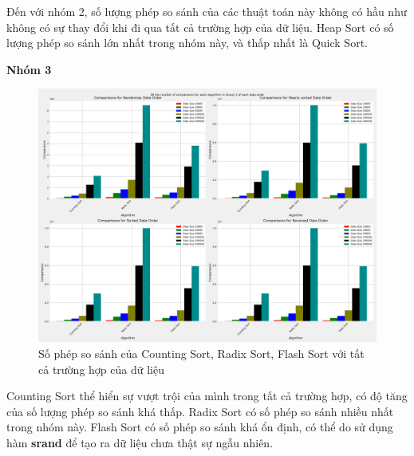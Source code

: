 Đến với nhóm 2, số lượng phép so sánh của các thuật toán này không có hầu như không có sự thay đổi khi đi qua tất cả trường hợp của dữ liệu. Heap Sort có số lượng phép so sánh lớn nhất trong nhóm này, và thấp nhất là Quick Sort. 



\textbf{Nhóm 3}

\begin{figure}[H]
    \centering
    \includegraphics[width=\textwidth]{experimental_result/images/all_the_number_of_comparisons_for_each_algorithm_in_group_3_of_each_data_order.png}
    \caption{Số phép so sánh của Counting Sort, Radix Sort, Flash Sort với tất cả trường hợp của dữ liệu}
    \label{fig:all_the_number_of_comparisons_for_each_algorithm_in_group_3_of_each_data_order}
\end{figure}

Counting Sort thể hiển sự vượt trội của mình trong tất cả trường hợp, có độ tăng của số lượng phép so sánh khá thấp. Radix Sort có số phép so sánh nhiều nhất trong nhóm này. Flash Sort có số phép so sánh khá ổn định, có thể do sử dụng hàm \textbf{srand} để tạo ra dữ liệu chưa thật sự ngẫu nhiên.

